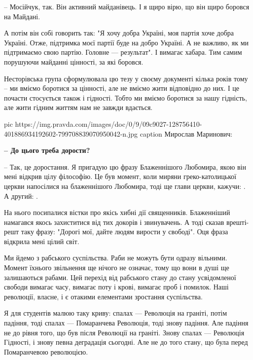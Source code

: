 – Мосійчук, так. Він активний майданівець. І я щиро вірю, що він щиро боровся
на Майдані. 

А потім він собі говорить так: "Я хочу добра Україні, моя партія хоче добра
Україні. Отже, підтримка моєї партії буде на добро Україні. А не важливо, як ми
підтримаємо свою партію. Головне --- результат". І вимагає хабара. Тим самим
порушуючи майданні цінності, за які боровся.

Несторівська група сформулювала цю тезу у своєму документі кілька років тому –
ми вміємо боротися за цінності, але не вміємо жити відповідно до них. І це
почасти стосується також і гідності. Тобто ми вміємо боротися за нашу гідність,
але жити гідним життям нам не завжди вдається.

\ifcmt
pic https://img.pravda.com/images/doc/0/9/09c9027-128756410-401886934192602-799708839070950042-n.jpg
caption Мирослав Маринович: 
\fi

{\bfseries 
– До цього треба дорости?
}

– Так, це доростання. Я пригадую цю фразу Блаженнішого Любомира, якою він мені
відкрив цілу філософію. Це був момент, коли миряни греко-католицької церкви
напосілися на блаженнішого Любомира, тоді ще глави церкви, кажучи: . 
А другий: .

На нього посипалися вістки про якісь хибні дії священників. Блаженніший
намагався якось захиститися від тих докорів і звинувачень. А тоді сказав
врешті-решт таку фразу: "Дорогі мої, дайте людям вирости у свободі". Оця фраза
відкрила мені цілий світ. 

Ми йдемо з рабського суспільства. Раби не можуть бути одразу вільними. Момент
їхнього звільнення ще нічого не означає, тому що вони в душі ще залишаються
рабами. Цей перехід від рабського стану до стану усвідомленої свободи вимагає
часу, вимагає поту і крові, вимагає проб і помилок. Наші революції, власне, і є
отакими елементами зростання суспільства.

Я для студентів малюю таку криву: спалах --- Революція на граніті, потім падіння,
тоді спалах --- Помаранчева Революція, тоді знову падіння. Але падіння не до
рівня того, що був після Революції на граніті. Знову спалах --- Революція
Гідності, і знову певна деградація сьогодні. Але не до того стану, що була
перед Помаранчевою революцією. 

